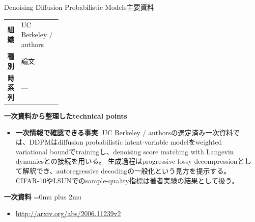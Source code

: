 \begin{technicalnote}{Denoising Diffusion Probabilistic Models}{主要資料}
\begingroup
\begin{tabularx}{\linewidth}{@{}>{\bfseries}p{0.22\linewidth}X@{}}
組織 & UC Berkeley / authors \\
種別 & 論文 \\
時系列 & — \\
\end{tabularx}
\smallskip
{\bfseries 一次資料から整理したtechnical points}
\begin{itemize}[leftmargin=1.5em,itemsep=0.35em]
\item \textbf{一次情報で確認できる事実}: UC Berkeley / authorsの選定済み一次資料では、DDPMはdiffusion probabilistic latent-variable modelをweighted variational boundでtrainingし、denoising score matching with Langevin dynamicsとの接続を用いる。 生成過程はprogressive lossy decompressionとして解釈でき、autoregressive decodingの一般化という見方を提示する。 CIFAR-10やLSUNでのsample-quality指標は著者実験の結果として扱う。
\end{itemize}
\begin{minipage}{\linewidth}
\begin{samepage}
{\bfseries 一次資料}
\begingroup\sloppy
\Urlmuskip=0mu plus 2mu\relax
\begin{itemize}[leftmargin=1.5em,itemsep=0.25em]
\item {\scriptsize\url{http://arxiv.org/abs/2006.11239v2}}
\end{itemize}
\endgroup
\end{samepage}
\end{minipage}
\endgroup
\end{technicalnote}
\medskip


